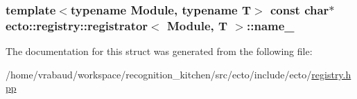 \subsubsection[{name\+\_\+}]{\setlength{\rightskip}{0pt plus 5cm}template$<$typename Module, typename T$>$ const char$\ast$ {\bf ecto\+::registry\+::registrator}$<$ Module, T $>$\+::name\+\_\+}\label{structecto_1_1registry_1_1registrator_a794acc964cefc0a374129823b4ee5246}


The documentation for this struct was generated from the following file\+:\begin{DoxyCompactItemize}
\item 
/home/vrabaud/workspace/recognition\+\_\+kitchen/src/ecto/include/ecto/\hyperlink{registry_8hpp}{registry.\+hpp}\end{DoxyCompactItemize}
